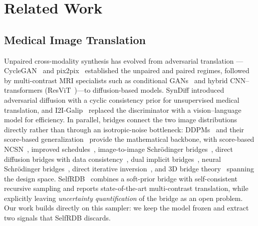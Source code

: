 \section{Related Work}
\label{sec:related}

\subsection{Medical Image Translation}
Unpaired cross-modality synthesis has evolved from adversarial translation
---CycleGAN~\cite{zhu2017cyclegan} and pix2pix~\cite{isola2017pix2pix} established
the unpaired and paired regimes, followed by multi-contrast MRI specialists such
as conditional GANs~\cite{dar2019cgan} and hybrid CNN--transformers
(ResViT~\cite{dalmaz2022resvit})---to diffusion-based models. SynDiff
\cite{ozbey2023syndiff} introduced adversarial diffusion with a cyclic
consistency prior for unsupervised medical translation, and
I2I-Galip~\cite{korkmaz2025i2igalip} replaced the discriminator with a
vision--language model for efficiency. In parallel, bridges connect the two
image distributions directly rather than through an isotropic-noise bottleneck:
DDPMs~\cite{ho2020ddpm} and their score-based generalization~\cite{song2021scoresde}
provide the mathematical backbone, with score-based
NCSN~\cite{song2019ncsn}, improved schedules~\cite{nichol2021iddpm}, image-to-image
Schr{\"o}dinger bridges~\cite{liu2023i2sb}, direct
diffusion bridges with data consistency~\cite{chung2023directbridge}, dual
implicit bridges~\cite{su2023ddib}, neural Schr{\"o}dinger
bridges~\cite{kim2024nsb}, direct iterative inversion~\cite{delbracio2023indi},
and 3D bridge theory~\cite{zhang2025bridge3d}
spanning the design space. SelfRDB~\cite{arslan2025selfrdb} combines a soft-prior
bridge with self-consistent recursive sampling and reports state-of-the-art
multi-contrast translation, while explicitly leaving \emph{uncertainty
quantification} of the bridge as an open problem. Our work builds directly on
this sampler: we keep the model frozen and extract two signals that SelfRDB
discards.

